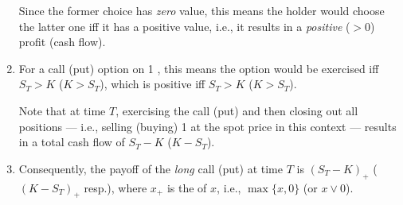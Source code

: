 \begin{enumerate}
Since the former choice has \emph{zero} value, this means the holder would
choose the latter one iff it has a positive value, i.e., it results in a
\emph{positive} (\(>0\)) profit (cash flow).

\item \label{it:call-put-ex-criterion}
For a call (put) option  on 1 , this means the
option would be exercised iff \(S_T>K\) (\(K>S_T\)), which is positive iff
\(S_T>K\) (\(K>S_T\)).

\begin{pf}
Note that at time \(T\), exercising the call (put) and then closing out all
positions --- i.e., selling (buying) 1  at the spot price in
this context --- results in a total cash flow of \(S_T-K\) (\(K-S_T\)).
\end{pf}
\item \label{it:lc-lp-payoff}
Consequently, the payoff of the \emph{long} call (put) at time \(T\) is
\((S_T-K)_+\) (\((K-S_T)_+\) resp.), where \(x_{+}\) is the  of \(x\), i.e., \(\max\{x,0\}\) (or \(x\vee 0\)).


\end{enumerate}
